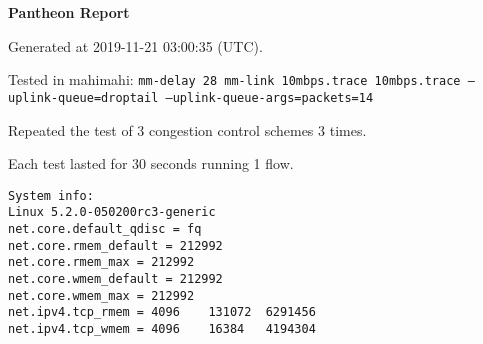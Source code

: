 \documentclass{article}
\begin{document}
\centerline{\textbf{\large{Pantheon Report}}}
\vspace{20pt}

Generated at 2019-11-21 03:00:35 (UTC).

Tested in mahimahi: \texttt{mm-delay 28 mm-link 10mbps.trace 10mbps.trace --uplink-queue=droptail --uplink-queue-args=packets=14}

Repeated the test of 3 congestion control schemes 3 times.

Each test lasted for 30 seconds running 1 flow.

\begin{verbatim}
System info:
Linux 5.2.0-050200rc3-generic
net.core.default_qdisc = fq
net.core.rmem_default = 212992
net.core.rmem_max = 212992
net.core.wmem_default = 212992
net.core.wmem_max = 212992
net.ipv4.tcp_rmem = 4096	131072	6291456
net.ipv4.tcp_wmem = 4096	16384	4194304
\end{verbatim}
\end{document}
